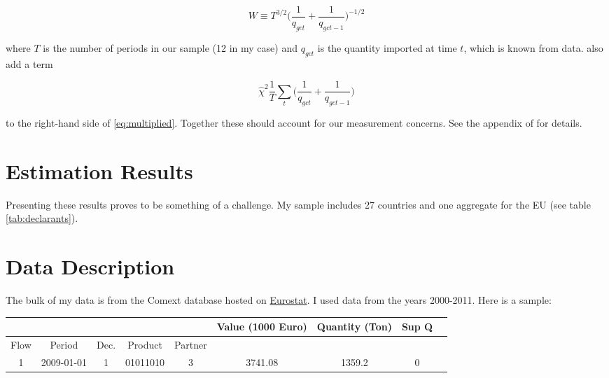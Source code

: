\documentclass[12pt,a4paper]{article}                      %
\begin{document}
\begin{equation}
    W \equiv T^{3/2}\Big(\frac{1}{q_{gct}} + \frac{1}{q_{gct - 1}})^{-1/2}
\end{equation}

where $T$ is the number of periods in our sample (12 in my case) and $q_{gct}$ is the quantity imported at time $t$, which is known from data.  \cite{broda_weinstein_2006_globalization_gains} also add a term

\begin{equation}
    \hat{\chi}^2 \frac{1}{T} \sum_t \big(\frac{1}{q_{gct}} + \frac{1}{q_{gct-1}})
\end{equation}

to the right-hand side of \ref{eq:multiplied}.  Together these should account for our measurement concerns.  See the appendix of \cite{broda_weinstein_2006_globalization_gains} for details.

\section{Estimation Results}
\label{sec:estimation_results}

Presenting these results proves to be something of a challenge.  My sample includes 27 countries and one aggregate for the EU (see table \ref{tab:declarants}).  


\section{Data Description}

The bulk of my data is from the Comext database hosted on \href{http://epp.eurostat.ec.europa.eu/portal/page/portal/eurostat/home/}{Eurostat}.  I used data from the years 2000-2011.  Here is a sample:

  \begin{table}[h]\label{tab:sample_row}
  \begin{tabular}{|c|c|c|c|c|c|c|c|c|}\footnotesize
    & & & & & Value (1000 Euro) & Quantity (Ton) & Sup Q \\ \hline
    Flow & Period & Dec. & Product & Partner &  &  &     \\ \hline
    1 & 2009-01-01 & 1  & 01011010 & 3       & 3741.08 & 1359.2 & 0\\ \hline
  \end{tabular}
  \end{table}
\end{document}
